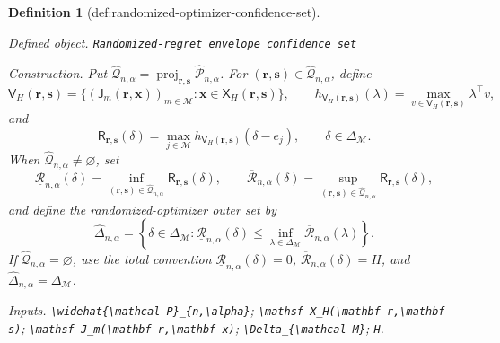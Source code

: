 \documentclass{article}
\newtheorem{definition}{Definition}
\begin{document}
\begin{definition}[def:randomized-optimizer-confidence-set]\label{def:randomized-optimizer-confidence-set}
\par\smallskip\noindent\emph{Defined object.} \texttt{Randomized-\allowbreak{}regret envelope confidence set}
\par\smallskip\noindent\emph{Construction.} Put \(\widehat{\mathcal Q}_{n,\alpha}=\operatorname{proj}_{\mathbf r,\mathbf s}\widehat{\mathcal P}_{n,\alpha}\).  For \((\mathbf r,\mathbf s)\in\widehat{\mathcal Q}_{n,\alpha}\), define
\[
 \mathsf V_H(\mathbf r,\mathbf s)
 =\{(\mathsf J_m(\mathbf r,\mathbf x))_{m\in\mathcal M}:
       \mathbf x\in\mathsf X_H(\mathbf r,\mathbf s)\},
 \qquad
 h_{\mathsf V_H(\mathbf r,\mathbf s)}(\lambda)
 =\max_{v\in\mathsf V_H(\mathbf r,\mathbf s)}\lambda^\top v,
\]
and
\[
 \mathsf R_{\mathbf r,\mathbf s}(\delta)
 =\max_{j\in\mathcal M}
   h_{\mathsf V_H(\mathbf r,\mathbf s)}(\delta-e_j),
 \qquad \delta\in\Delta_{\mathcal M}.
\]
When \(\widehat{\mathcal Q}_{n,\alpha}\ne\varnothing\), set
\[
 \underline{\mathcal R}_{n,\alpha}(\delta)
 =\inf_{(\mathbf r,\mathbf s)\in\widehat{\mathcal Q}_{n,\alpha}}
      \mathsf R_{\mathbf r,\mathbf s}(\delta),
 \qquad
 \overline{\mathcal R}_{n,\alpha}(\delta)
 =\sup_{(\mathbf r,\mathbf s)\in\widehat{\mathcal Q}_{n,\alpha}}
      \mathsf R_{\mathbf r,\mathbf s}(\delta),
\]
and define the randomized-optimizer outer set by
\[
 \widehat{\Delta}_{n,\alpha}
 =\left\{\delta\in\Delta_{\mathcal M}:
   \underline{\mathcal R}_{n,\alpha}(\delta)
   \le \inf_{\lambda\in\Delta_{\mathcal M}}
          \overline{\mathcal R}_{n,\alpha}(\lambda)\right\}.
\]
If \(\widehat{\mathcal Q}_{n,\alpha}=\varnothing\), use the total convention \(\underline{\mathcal R}_{n,\alpha}(\delta)=0\), \(\overline{\mathcal R}_{n,\alpha}(\delta)=H\), and \(\widehat{\Delta}_{n,\alpha}=\Delta_{\mathcal M}\).
\par\smallskip\noindent\emph{Inputs.} \texttt{\textbackslash{}\allowbreak{}widehat\{\textbackslash{}\allowbreak{}mathcal P\}\allowbreak{}\_\allowbreak{}\{n,\allowbreak{}\textbackslash{}\allowbreak{}alpha\}\allowbreak{}}; \texttt{\textbackslash{}\allowbreak{}mathsf X\_\allowbreak{}H(\textbackslash{}\allowbreak{}mathbf r,\allowbreak{}\textbackslash{}\allowbreak{}mathbf s)}; \texttt{\textbackslash{}\allowbreak{}mathsf J\_\allowbreak{}m(\textbackslash{}\allowbreak{}mathbf r,\allowbreak{}\textbackslash{}\allowbreak{}mathbf x)}; \texttt{\textbackslash{}\allowbreak{}Delta\_\allowbreak{}\{\textbackslash{}\allowbreak{}mathcal M\}\allowbreak{}}; \texttt{H}.
\end{definition}
\end{document}
